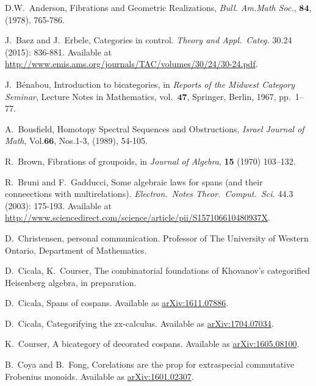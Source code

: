 \documentclass[11pt]{amsart}
\newcommand{\cat}[1]{\mathbf{#1}}
\theoremstyle{remark}
\theoremstyle{definition}
\begin{document}
%
\begin{thebibliography}{100}
D.W.\ Anderson,
Fibrations and Geometric Realizations,
\emph{Bull. Am.Math Soc.}, $\mathbf{84}$, (1978), 765-786.

J.~Baez and J.~Erbele,
Categories in control.
\emph{Theory and Appl.~Categ.} 
30.24 (2015): 836-881.
Available at \href{http://www.emis.ams.org/journals/TAC/volumes/30/24/30-24.pdf}{http://www.emis.ams.org/journals/TAC/volumes/30/24/30-24.pdf}.

J.~B\'enabou, 
Introduction to bicategories, 
in \emph{Reports of the Midwest Category Seminar}, 
Lecture Notes in Mathematics, 
vol.\ $\cat{47}$, 
Springer, Berlin, 1967, pp.\ 1--77. 

A.\ Bousfield,
Homotopy Spectral Sequences and Obstructions,
\emph{Israel Journal of Math},
Vol.$\mathbf{66}$, Nos.1-3, (1989), 54-105.

R.\ Brown,
Fibrations of groupoids,
in \emph{Journal of Algebra},
\textbf{15} (1970) 103--132.

R.~Bruni and F.~Gadducci,
Some algebraic laws for spans (and their conneections with multirelations).
\emph{Electron.~Notes Theor.~Comput.~Sci.}
44.3 (2003): 175-193.
Available at \href{http://www.sciencedirect.com/science/article/pii/S157106610480937X}{http://www.sciencedirect.com/science/article/pii/S157106610480937X}.

D.~Christensen, personal communication. Professor of The University of Western Ontario, Department of Mathematics.

D.~Cicala, K.~Courser,
The combinatorial foundations of Khovanov's categorified Heisenberg algebra, in preparation.

D.~Cicala, 
Spans of cospans.
Available as \href{https://arxiv.org/abs/1611.07886}{arXiv:1611.07886}.

D.~Cicala, 
Categorifying the zx-calculus.
Available as \href{https://arxiv.org/abs/1704.07034}{arXiv:1704.07034}.

K.~Courser, 
A bicategory of decorated cospans. 
Available as \href{https://arxiv.org/pdf/1605.08100v2.pdf}{arXiv:1605.08100}.

B.~Coya and B.~Fong,
Corelations are the prop for extraspecial commutative Frobenius monoids.
Available as \href{https://arxiv.org/abs/1601.02307}{arXiv:1601.02307}.


\end{thebibliography}
\end{document}
